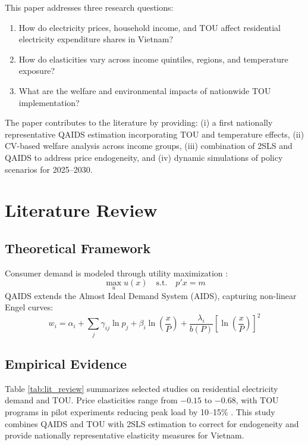 \documentclass[12pt,a4paper]{article}
\begin{document}
	This paper addresses three research questions:
	\begin{enumerate}
		\item How do electricity prices, household income, and TOU affect residential electricity expenditure shares in Vietnam?
		\item How do elasticities vary across income quintiles, regions, and temperature exposure?
		\item What are the welfare and environmental impacts of nationwide TOU implementation?
	\end{enumerate}
	The paper contributes to the literature by providing: (i) a first nationally representative QAIDS estimation incorporating TOU and temperature effects, (ii) CV-based welfare analysis across income groups, (iii) combination of 2SLS and QAIDS to address price endogeneity, and (iv) dynamic simulations of policy scenarios for 2025--2030.
	
	\section{Literature Review}
	\subsection{Theoretical Framework}
	Consumer demand is modeled through utility maximization \citep{varian1992}:
	\[
	\max_u u(x) \quad \text{s.t.} \quad p'x = m
	\]
	QAIDS \citep{banks1997} extends the Almost Ideal Demand System (AIDS), capturing non-linear Engel curves:
	\[
	w_i = \alpha_i + \sum_j \gamma_{ij} \ln p_j + \beta_i \ln\left(\frac{x}{P}\right) + \frac{\lambda_i}{b(P)} \left[\ln\left(\frac{x}{P}\right)\right]^2
	\]
	
	\subsection{Empirical Evidence}
	Table \ref{tab:lit_review} summarizes selected studies on residential electricity demand and TOU. Price elasticities range from $-0.15$ to $-0.68$, with TOU programs in pilot experiments reducing peak load by 10--15\% \citep{faruqui2010, jessoe2014}.  
	This study combines QAIDS and TOU with 2SLS estimation to correct for endogeneity and provide nationally representative elasticity measures for Vietnam.
	
\end{document}
